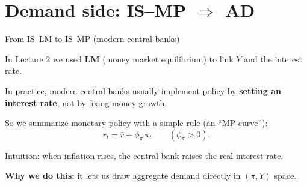 \documentclass[aspectratio=169,xcolor=dvipsnames]{beamer}
\let\tempone\itemize
\let\temptwo\enditemize
\renewenvironment{itemize}{\tempone\addtolength{\itemsep}{\fill}}{\temptwo}
\let\tempa\enumerate
\let\tempb\endenumerate
\renewenvironment{enumerate}{\tempa\addtolength{\itemsep}{\fill}}{\tempb}
\begin{document}


\section[Demand]{Demand side: IS--MP $\Rightarrow$ AD}

\begin{frame}{From IS--LM to IS--MP (modern central banks)}
\begin{itemize}
\item In Lecture 2 we used \textbf{LM} (money market equilibrium) to link $Y$ and the interest rate.
\item In practice, modern central banks usually implement policy by \textbf{setting an interest rate}, not by fixing money growth.
\item So we summarize monetary policy with a simple rule (an ``MP curve''):
\[
r_t = \bar r + \phi_\pi \,\pi_t \qquad (\phi_\pi>0).
\]
\item Intuition: when inflation rises, the central bank raises the real interest rate.
\end{itemize}

\vspace{0.3em}
\textbf{Why we do this:} it lets us draw aggregate demand directly in $(\pi,Y)$ space.
\end{frame}
\end{document}

